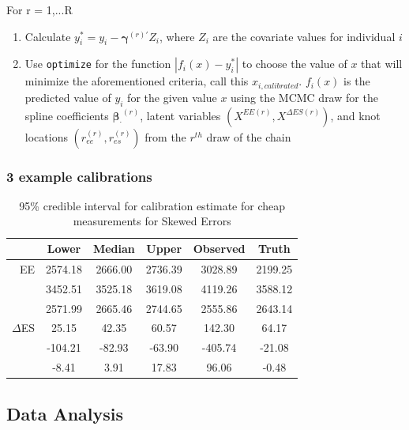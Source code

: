 \documentclass[handout]{beamer}\usepackage[]{graphicx}\usepackage[]{color}
\begin{document}
\begin{frame}

For r = 1,...R
\begin{enumerate}
\item
Calculate $y_i^* = y_i- \boldsymbol{\gamma}^{(r)'} Z_i$, where $Z_i$ are the covariate values for individual $i$
\item
Use \texttt{optimize} for the function $|f_i(x) - y_i^*|$ to choose the value of $x$ that will minimize the aforementioned criteria, call this $x_{i,calibrated}$. $f_i(x)$ is the predicted value of $y_i$ for the given value $x$ using the MCMC draw for the spline coefficients $\boldsymbol{\beta_{\cdot}}^{(r)}$, latent variables $({ X^{EE(r)},X^{\Delta ES (r)}})$, and knot locations $(r_{ee}^{(r)},r_{es}^{(r)})$ from the $r^{th}$ draw of the chain

\end{enumerate}


\end{frame}

\begin{frame}
\frametitle{3 example calibrations}

\begin{table}[ht]
\centering
\begin{tabular}{r|ccc|cc}
  \hline
& Lower & Median & Upper & Observed & Truth \\ 
  \hline
EE & 2574.18 & 2666.00 & 2736.39 & 3028.89 & 2199.25 \\ 
  & 3452.51 & 3525.18 & 3619.08 & 4119.26 & 3588.12 \\ 
  & 2571.99 & 2665.46 & 2744.65 & 2555.86 & 2643.14 \\ 
   \hline  
   $\Delta$ES & 25.15 & 42.35 & 60.57 & 142.30 & 64.17 \\ 
  & -104.21 & -82.93 & -63.90 & -405.74 & -21.08 \\ 
  & -8.41 & 3.91 & 17.83 & 96.06 & -0.48 \\ 
   \hline
\end{tabular}
\caption{95\% credible interval for calibration estimate for cheap measurements for Skewed Errors} 
\label{calibratedee}
\end{table}

\end{frame}

\subsection{Data Analysis}
\end{document}

